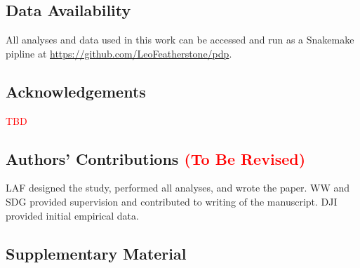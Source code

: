 \documentclass[12pt]{article}
\begin{document}
\begin{spacing}{2}
\subsection*{Data Availability}
All analyses and data used in this work can be accessed and run as a Snakemake pipline at \href{https://github.com/LeoFeatherstone/pdp}{https://github.com/LeoFeatherstone/pdp}.

\subsection*{Acknowledgements}
\textcolor{red}{TBD}

\subsection*{Authors' Contributions \textcolor{red}{(To Be Revised)}}
LAF designed the study, performed all analyses, and wrote the paper. WW and SDG provided supervision and contributed to writing of the manuscript. DJI provided initial empirical data.

\end{spacing}




\subsection*{Supplementary Material}

\renewcommand{\thefigure}{S\arabic{figure}}
\renewcommand{\thetable}{S\arabic{table}}
\setcounter{figure}{0}
\setcounter{table}{0}
\end{document}
